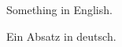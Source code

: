 \documentclass[../thesis.tex]{subfiles}
\begin{document}
\label{chp:abstract}

Something in English.
\newline

Ein Absatz in deutsch.
\end{document}
